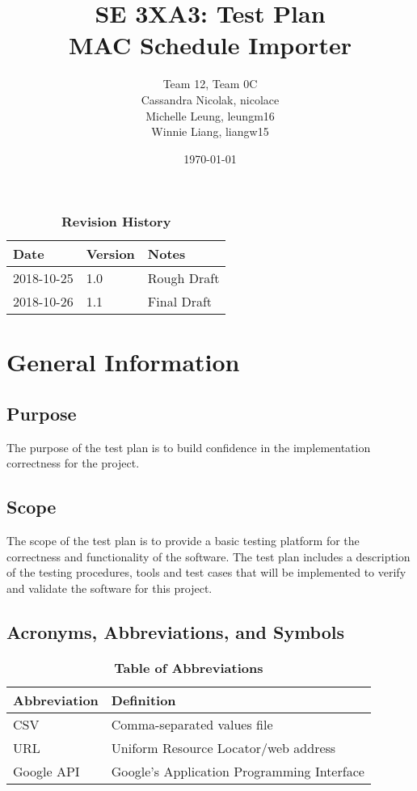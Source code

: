 \documentclass[12pt, titlepage]{article}
\title{SE 3XA3: Test Plan\\MAC Schedule Importer}
\author{Team 12, Team 0C
		\\ Cassandra Nicolak, nicolace
		\\ Michelle Leung, leungm16
		\\ Winnie Liang, liangw15
}
\date{\today}
\begin{document}
\maketitle

\tableofcontents
\listoftables
\listoffigures

\begin{table}[bp]
\caption{\bf Revision History}
\begin{tabularx}{\textwidth}{p{3cm}p{2cm}X}
\toprule {\bf Date} & {\bf Version} & {\bf Notes}\\
\midrule
2018-10-25 & 1.0 & Rough Draft\\
2018-10-26 & 1.1 & Final Draft\\
\bottomrule
\end{tabularx}
\end{table}

\newpage



\section{General Information}

\subsection{Purpose}
The purpose of the test plan is to build confidence in the implementation correctness for the project. 

\subsection{Scope}
The scope of the test plan is to provide a basic testing platform for the correctness and functionality of the software. The test plan includes a description of the testing procedures, tools and test cases that will be implemented to verify and validate the software for this project.
\subsection{Acronyms, Abbreviations, and Symbols}
	
\begin{table}[hbp]
\caption{\textbf{Table of Abbreviations}} \label{Table}

\begin{tabularx}{\textwidth}{p{3cm}X}
\toprule
\textbf{Abbreviation} & \textbf{Definition} \\
\midrule
CSV & Comma-separated values file\\
URL & Uniform Resource Locator/web address\\
Google API & Google’s Application Programming Interface\\
\bottomrule
\end{tabularx}

\end{table}
\end{document}
